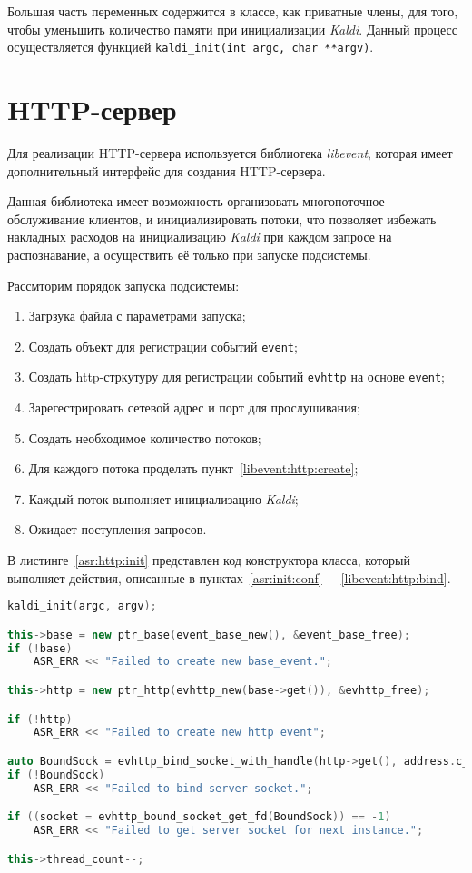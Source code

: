 Большая часть переменных содержится в классе, как приватные члены, для того, чтобы
уменьшить количество памяти при инициализации \textit{Kaldi}.
Данный процесс осуществляется функцией \texttt{kaldi\_init(int argc, char **argv)}.
\section{HTTP-сервер}

Для реализации HTTP-сервера используется библиотека \textit{libevent}, которая
имеет дополнительный интерфейс для создания HTTP-сервера.

Данная библиотека имеет возможность организовать многопоточное обслуживание клиентов,
и инициализировать потоки, что позволяет избежать накладных расходов на инициализацию
\textit{Kaldi} при каждом запросе на распознавание, а осуществить её только
при запуске подсистемы.

Рассмторим порядок запуска подсистемы:
\begin{enumerate}
    \item Загрзука файла с параметрами запуска;\label{asr:init:conf}
    \item Создать объект для регистрации событий \texttt{event};\label{libevent:event:create}
    \item Создать http-стркутуру для регистрации событий \texttt{evhttp}
        на основе \texttt{event};\label{libevent:http:create}
    \item Зарегестрировать сетевой адрес и порт для прослушивания;\label{libevent:http:bind}
    \item Создать необходимое количество потоков;
    \item Для каждого потока проделать пункт~\ref{libevent:http:create};
    \item Каждый поток выполняет инициализацию \textit{Kaldi};
    \item Ожидает поступления запросов.
\end{enumerate}

В листинге~\ref{asr:http:init} представлен код конструктора класса, который
выполняет действия, описанные в пунктах~\ref{asr:init:conf}~--~\ref{libevent:http:bind}.


\begin{lstlisting}[caption={Создание базовых объектов для инициализации подсистемы},label={asr:http:init},language=C++]
kaldi_init(argc, argv);

this->base = new ptr_base(event_base_new(), &event_base_free);
if (!base)
    ASR_ERR << "Failed to create new base_event.";

this->http = new ptr_http(evhttp_new(base->get()), &evhttp_free);

if (!http)
    ASR_ERR << "Failed to create new http event";

auto BoundSock = evhttp_bind_socket_with_handle(http->get(), address.c_str(), port);
if (!BoundSock)
    ASR_ERR << "Failed to bind server socket.";

if ((socket = evhttp_bound_socket_get_fd(BoundSock)) == -1)
    ASR_ERR << "Failed to get server socket for next instance.";

this->thread_count--;

\end{lstlisting}

